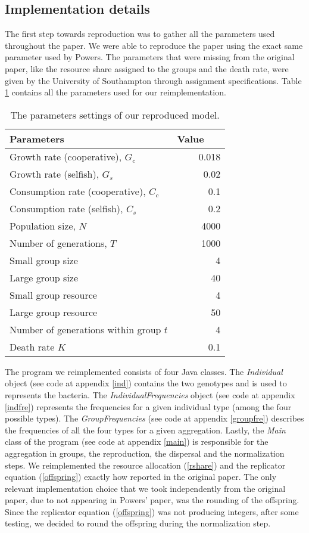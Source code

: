 \documentclass[runningheads]{llncs}
\begin{document}
\subsection{Implementation details}
The first step towards reproduction was to gather all the parameters
used throughout the paper. We were able to reproduce the paper using
the exact same parameter used by Powers. The parameters that were
missing from the original paper, like the resource share assigned to
the groups and the death rate, were given by the University of
Southampton through assignment specifications. Table
\ref{tab_parameters} contains all the parameters used for our
reimplementation.
\begin{table}
\caption{The parameters settings of our reproduced model.}\label{tab_parameters}
\begin{tabular}{|l|r|}
\hline
\textbf{Parameters}~~~ & \textbf{Value}~~~ \\
\hline
Growth rate (cooperative), $G_c$ & 0.018 \\
\hline
Growth rate (selfish), $G_s$ & 0.02 \\
\hline
Consumption rate (cooperative), $C_c$ & 0.1 \\
\hline
Consumption rate (selfish), $C_s$ & 0.2 \\
\hline
Population size, $N$ & 4000 \\
\hline
Number of generations, $T$ & 1000 \\
\hline
Small group size & 4 \\
\hline
Large group size & 40 \\
\hline
Small group resource & 4 \\
\hline
Large group resource & 50 \\
\hline
Number of generations within group $t$ & 4 \\
\hline
Death rate $K$ & 0.1 \\
\hline
\end{tabular}
\end{table}
The program we reimplemented consists of four Java classes. The
\textit{Individual} object (see code at appendix \ref{ind}) contains the two
genotypes and is used to represents the bacteria. The
\textit{IndividualFrequencies} object (see code at appendix \ref{indfre})
represents the frequencies for a given individual type (among the four
possible types). The \textit{GroupFrequencies} (see code at appendix
\ref{groupfre}) describes the frequencies of all the four types for a
given aggregation. Lastly, the \textit{Main} class of the program (see
code at appendix \ref{main}) is responsible for the aggregation in
groups, the reproduction, the dispersal and the
normalization steps. We reimplemented the resource allocation
(\ref{rshare}) and the replicator equation (\ref{offspring}) exactly
how reported in the original paper. The only relevant implementation
choice that we took independently from the original paper, due to not
appearing in Powers' paper, was the rounding of the offspring. Since
the replicator equation (\ref{offspring}) was not producing integers,
after some testing, we decided to round the offspring during the
normalization step.
\end{document}
